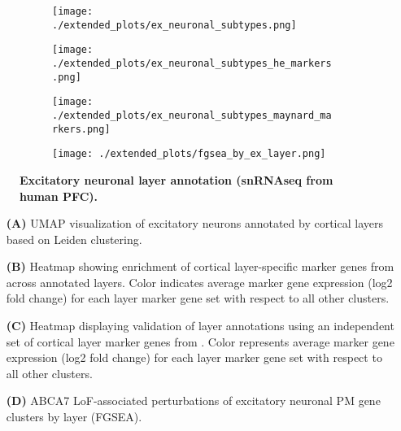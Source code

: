 \begin{figure}[H]
    \begin{subfigure}[t]{.3\textwidth}
        \caption{}
        \texttt{[image: ./extended\_plots/ex\_neuronal\_subtypes.png]}        
    \end{subfigure}
    \begin{subfigure}[t]{.3\textwidth}
        \caption{}
        \texttt{[image: ./extended\_plots/ex\_neuronal\_subtypes\_he\_markers.png]}        
    \end{subfigure}
    \begin{subfigure}[t]{.3\textwidth}
        \caption{}
        \texttt{[image: ./extended\_plots/ex\_neuronal\_subtypes\_maynard\_markers.png]}        
    \end{subfigure}
    \begin{subfigure}[t]{0.8\textwidth}
        \caption{}
        \texttt{[image: ./extended\_plots/fgsea\_by\_ex\_layer.png]}        
    \end{subfigure}
    \caption{
        \textbf{Excitatory neuronal layer annotation (snRNAseq from human PFC).}\\
    }
    \label{fig:ex_layers}
\end{figure}
\begin{itemize}
    \item[\textbf{(A)}] UMAP visualization of excitatory neurons annotated by cortical layers based on Leiden clustering. 
    \item[\textbf{(B)}] Heatmap showing enrichment of cortical layer-specific marker genes from \cite{He2017-dq} across annotated layers. Color indicates average marker gene expression (log2 fold change) for each layer marker gene set with respect to all other clusters.    
    \item[\textbf{(C)}] Heatmap displaying validation of layer annotations using an independent set of cortical layer marker genes from \cite{Maynard2021-mz}. Color represents average marker gene expression (log2 fold change) for each layer marker gene set with respect to all other clusters.
    \item[\textbf{(D)}] ABCA7 LoF-associated perturbations of excitatory neuronal PM gene clusters by layer (FGSEA).
\end{itemize}